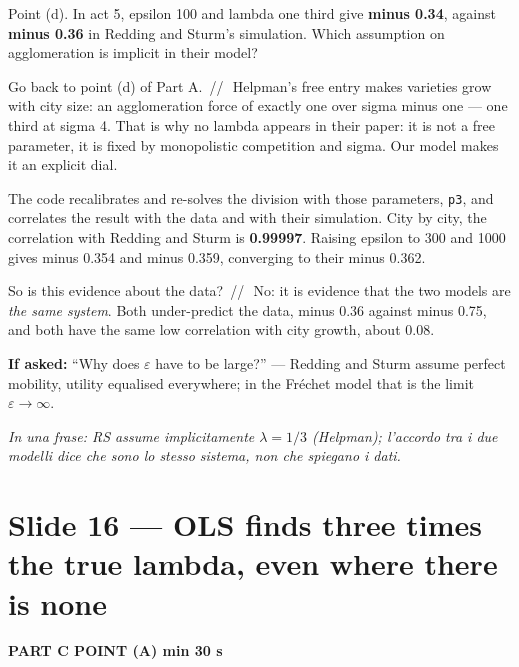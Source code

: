 \documentclass[11pt,a4paper]{article}
\newcommand{\slide}[3]{\Needspace{14\baselineskip}\section{#1}\textcolor{unicared}{\small\bfseries\MakeUppercase{#3}\quad\textperiodcentered\quad #2}\par}
\newcommand{\idea}[1]{\par{\small\itshape\color{unicablue}In una frase: #1}\par}
\newcommand{\pause}{\textcolor{unicared}{\,/\!/\,}}
\begin{document}
\begin{say}
Point (d). In act 5, epsilon 100 and lambda one third give \textbf{minus 0.34}, against \textbf{minus 0.36} in Redding and Sturm's simulation. Which assumption on agglomeration is implicit in their model?

Go back to point (d) of Part A. \pause\ Helpman's free entry makes varieties grow with city size: an agglomeration force of exactly one over sigma minus one --- one third at sigma 4. That is why no lambda appears in their paper: it is not a free parameter, it is fixed by monopolistic competition and sigma. Our model makes it an explicit dial.

The code recalibrates and re-solves the division with those parameters, \texttt{p3}, and correlates the result with the data and with their simulation. City by city, the correlation with Redding and Sturm is \textbf{0.99997}. Raising epsilon to 300 and 1000 gives minus 0.354 and minus 0.359, converging to their minus 0.362.

So is this evidence about the data? \pause\ No: it is evidence that the two models are \emph{the same system}. Both under-predict the data, minus 0.36 against minus 0.75, and both have the same low correlation with city growth, about 0.08.
\end{say}

\begin{ask}
\textbf{If asked:} ``Why does $\varepsilon$ have to be large?'' --- Redding and Sturm assume perfect mobility, utility equalised everywhere; in the Fréchet model that is the limit $\varepsilon\to\infty$.
\end{ask}
\idea{RS assume implicitamente $\lambda = 1/3$ (Helpman); l'accordo tra i due modelli dice che sono lo stesso sistema, non che spiegano i dati.}

\slide{Slide 16 --- OLS finds three times the true lambda, even where there is none}{1 min 30 s}{Part C \textperiodcentered{} point (a)}
\end{document}
